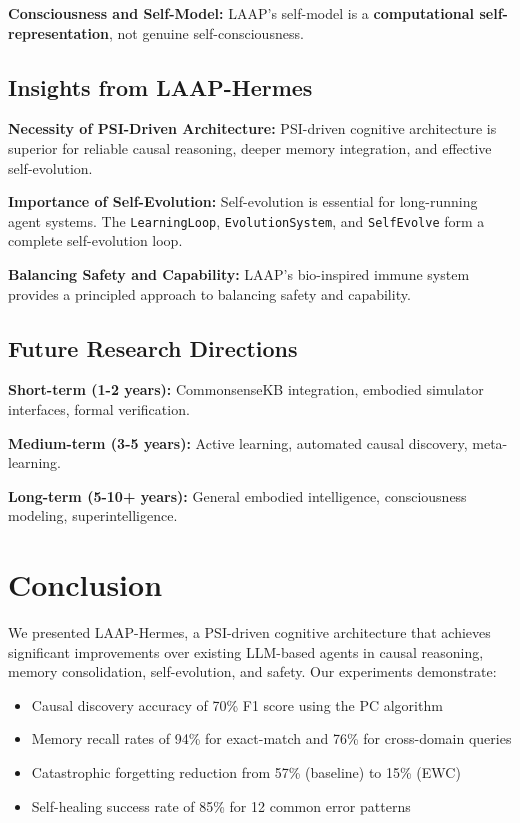 \documentclass[10pt,twocolumn,letterpaper]{article}
\begin{document}
\textbf{Consciousness and Self-Model:} LAAP's self-model is a \textbf{computational self-representation}, not genuine self-consciousness.

\subsection{Insights from LAAP-Hermes}
\label{ssec:insights}

\textbf{Necessity of PSI-Driven Architecture:} PSI-driven cognitive architecture is superior for reliable causal reasoning, deeper memory integration, and effective self-evolution.

\textbf{Importance of Self-Evolution:} Self-evolution is essential for long-running agent systems. The \texttt{LearningLoop}, \texttt{EvolutionSystem}, and \texttt{SelfEvolve} form a complete self-evolution loop.

\textbf{Balancing Safety and Capability:} LAAP's bio-inspired immune system provides a principled approach to balancing safety and capability.

\subsection{Future Research Directions}
\label{ssec:future_directions}

\textbf{Short-term (1-2 years):} CommonsenseKB integration, embodied simulator interfaces, formal verification.

\textbf{Medium-term (3-5 years):} Active learning, automated causal discovery, meta-learning.

\textbf{Long-term (5-10+ years):} General embodied intelligence, consciousness modeling, superintelligence.

\section{Conclusion}
\label{sec:conclusion}

We presented LAAP-Hermes, a PSI-driven cognitive architecture that achieves significant improvements over existing LLM-based agents in causal reasoning, memory consolidation, self-evolution, and safety. Our experiments demonstrate:

\begin{itemize}
    \item Causal discovery accuracy of 70\% F1 score using the PC algorithm
    \item Memory recall rates of 94\% for exact-match and 76\% for cross-domain queries
    \item Catastrophic forgetting reduction from 57\% (baseline) to 15\% (EWC)
    \item Self-healing success rate of 85\% for 12 common error patterns
\end{itemize}
\end{document}
